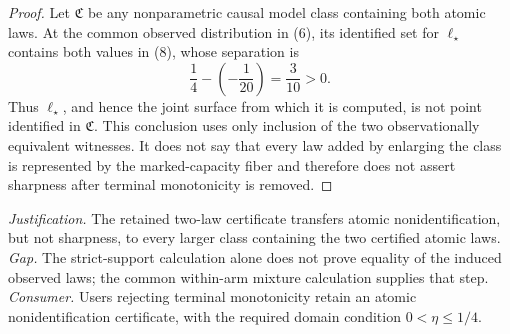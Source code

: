 \documentclass{article}
\begin{document}
\begin{proof}
Let \(\mathfrak C\) be any nonparametric causal model class containing both atomic laws.  At the common observed distribution in (6), its identified set for \(\ell_\star\) contains both values in (8), whose separation is
\[
 \frac14-\left(-\frac1{20}\right)=\frac3{10}>0. \tag{9}
\]
Thus \(\ell_\star\), and hence the joint surface from which it is computed, is not point identified in \(\mathfrak C\).  This conclusion uses only inclusion of the two observationally equivalent witnesses.  It does not say that every law added by enlarging the class is represented by the marked-capacity fiber and therefore does not assert sharpness after terminal monotonicity is removed.
\end{proof}
\par\smallskip\noindent \textit{Justification.} The retained two-law certificate transfers atomic nonidentification, but not sharpness, to every larger class containing the two certified atomic laws. \textit{Gap.} The strict-support calculation alone does not prove equality of the induced observed laws; the common within-arm mixture calculation supplies that step. \textit{Consumer.} Users rejecting terminal monotonicity retain an atomic nonidentification certificate, with the required domain condition \(0<\eta\leq1/4\).
\end{document}
